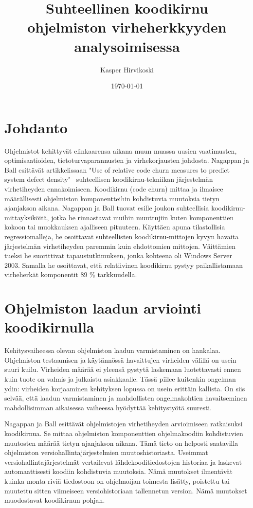 \documentclass[finnish]{../tktltiki2}
\title{Suhteellinen koodikirnu ohjelmiston virheherkkyyden\\analysoimisessa}
\author{Kasper Hirvikoski}
\date{\today}
\theoremstyle{definition}
\theoremstyle{remark}
\begin{document}

\maketitle

\tableofcontents
\newpage


\section{Johdanto}

Ohjelmistot kehittyvät elinkaarensa aikana muun muassa uusien vaatimusten, optimisaatioiden, tietoturvaparannusten ja virhekorjausten johdosta. Nagappan ja Ball esittävät artikkelissaan "Use of relative code churn measures to predict system defect density"~\cite{NB05} suhteellisen koodikirnu-tekniikan järjestelmän virhetiheyden ennakoimiseen. Koodikirnu (code churn) mittaa ja ilmaisee määrällisesti ohjelmiston komponentteihin kohdistuvia muutoksia tietyn ajanjakson aikana. Nagappan ja Ball tuovat esille joukon suhteellisia koodikirnu-mittayksiköitä, jotka he rinnastavat muihin muuttujiin kuten komponenttien kokoon tai muokkauksen ajalliseen pituuteen. Käyttäen apuna tilastollisia regressiomalleja, he osoittavat suhteellisten koodikirnu-mittojen kyvyn havaita järjestelmän virhetiheyden paremmin kuin ehdottomien mittojen. Väittämien tueksi he suorittivat tapaustutkimuksen, jonka kohteena oli Windows Server 2003. Samalla he osoittavat, että relatiivinen koodikirnu pystyy paikallistamaan virheherkät komponentit 89 \% tarkkuudella.

\section{Ohjelmiston laadun arviointi koodikirnulla}

Kehitysvaiheessa olevan ohjelmiston laadun varmistaminen on hankalaa. Ohjelmiston testaamisen ja käytännössä havaittujen virheiden välillä on usein suuri kuilu. Virheiden määrää ei yleensä pystytä laskemaan luotettavasti ennen kuin tuote on valmis ja julkaistu asiakkaalle. Tässä piilee kuitenkin ongelman ydin: virheiden korjaaminen kehityksen lopussa on usein erittäin kallista. On siis selvää, että laadun varmistaminen ja mahdollisten ongelmakohtien havaitseminen mahdollisimman aikaisessa vaiheessa hyödyttää kehitystyötä suuresti.

Nagappan ja Ball esittävät ohjelmistojen virhetiheyden arvioimiseen ratkaisuksi koodikirnua. Se mittaa ohjelmiston komponenttien ohjelmakoodiin kohdistuvien muutosten määrää tietyn ajanjakson aikana. Tämä tieto on helposti saatavilla ohjelmiston versiohallintajärjestelmien muutoshistoriasta. Useimmat versiohallintajärjestelmät vertailevat lähdekooditiedostojen historiaa ja laskevat automaattisesti koodiin kohdistuvia muutoksia. Nämä muutokset ilmentävät kuinka monta riviä tiedostoon on ohjelmoijan toimesta lisätty, poistettu tai muutettu sitten viimeiseen versiohistoriaan tallennetun version. Nämä muutokset muodostavat koodikirnun pohjan.
\end{document}
